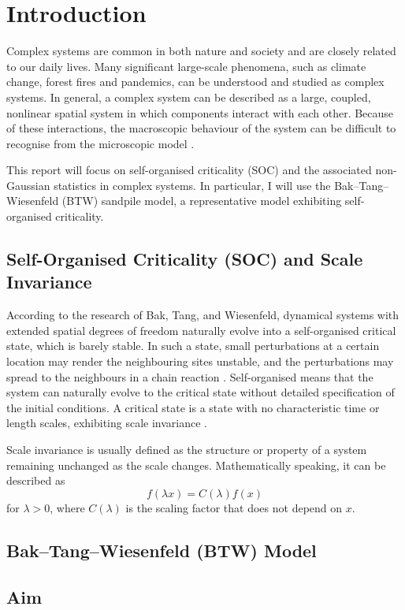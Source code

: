 \chapter{Introduction}\label{ch:introduction}

Complex systems are common in both nature and society and are closely related to our daily lives. Many significant large-scale phenomena, such as climate change, forest fires and pandemics, can be understood and studied as complex systems. In general, a complex system can be described as a large, coupled, nonlinear spatial system in which components interact with each other. Because of these interactions, the macroscopic behaviour of the system can be difficult to recognise from the microscopic model \cite{Fieguth2021}. 

This report will focus on self-organised criticality (SOC) and the associated non-Gaussian statistics in complex systems. In particular, I will use the Bak–Tang–Wiesenfeld (BTW) sandpile model, a representative model exhibiting self-organised criticality.

\section{Self-Organised Criticality (SOC) and Scale Invariance}

According to the research of Bak, Tang, and Wiesenfeld, dynamical systems with extended spatial degrees of freedom naturally evolve into a self-organised critical state, which is barely stable. In such a state, small perturbations at a certain location may render the neighbouring sites unstable, and the perturbations may spread to the neighbours in a chain reaction \cite{Bak1987}. Self-organised means that the system can naturally evolve to the critical state without detailed specification of the initial conditions. A critical state is a state with no characteristic time or length scales, exhibiting scale invariance \cite{Bak1988}.

Scale invariance is usually defined as the structure or property of a system remaining unchanged as the scale changes. Mathematically speaking, it can be described as $$f(\lambda x) = C(\lambda) f(x)$$
for $\lambda > 0$, where $C(\lambda)$ is the scaling factor that does not depend on $x$\cite{Khaluf2017}.

\section{Bak–Tang–Wiesenfeld (BTW) Model}

\section{Aim}


